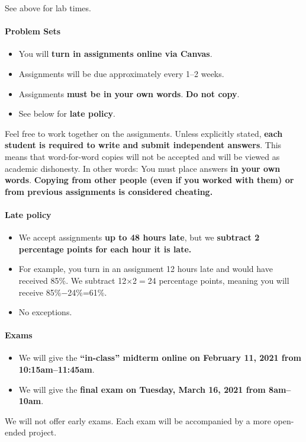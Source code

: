 \documentclass[10pt]{article}
\begin{document}
See above for lab times.

\paragraph{Problem Sets}
\begin{itemize}
  \item You will \textbf{turn in assignments online via Canvas}.
  \item Assignments will be due approximately every 1--2 weeks.
  \item Assignments \textbf{must be in your own words}. \textbf{Do not copy}.
  \item See below for \textbf{late policy}.
\end{itemize}
Feel free to work together on the assignments. Unless explicitly stated, \textbf{each student is required to write and submit independent answers}. This means that word-for-word copies will not be accepted and will be viewed as academic dishonesty. In other words: You must place answers \textbf{in your own words}. \textbf{Copying from other people (even if you worked with them) or from previous assignments is considered cheating.}

\paragraph{Late policy}
\begin{itemize}
  \item We accept assignments \textbf{up to 48 hours late}, but we \textbf{subtract 2 percentage points for each hour it is late.}
  \item For example, you turn in an assignment 12 hours late and would have received 85\%. We subtract 12$\times$2$=$24 percentage points, meaning you will receive 85\%$-$24\%=61\%.
  \item No exceptions.
\end{itemize}

\paragraph{Exams}
\begin{itemize}
  \item We will give the \textbf{``in-class'' midterm online on February 11, 2021 from 10:15am--11:45am}.
  \item We will give the \textbf{final exam on Tuesday, March 16, 2021 from 8am--10am}.
\end{itemize}
We will not offer early exams. Each exam will be accompanied by a more open-ended project.
\end{document}
